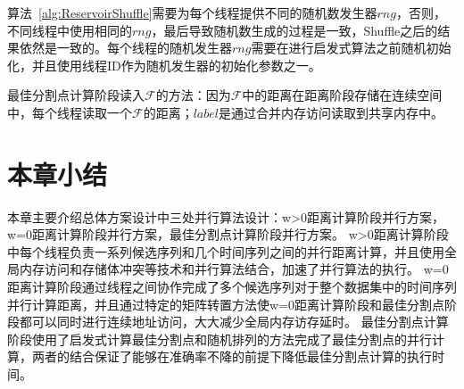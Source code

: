算法~\ref{alg:ReservoirShuffle}需要为每个线程提供不同的随机数发生器$rng$，否则，不同线程中使用相同的$rng$，最后导致随机数生成的过程是一致，Shuffle之后的结果依然是一致的。每个线程的随机发生器$rng$需要在进行启发式算法之前随机初始化，并且使用线程ID作为随机发生器的初始化参数之一。

最佳分割点计算阶段读入$\mathcal{F}$的方法：因为$\mathcal{F}$中的距离在距离阶段存储在连续空间中，每个线程读取一个$\mathcal{F}$的距离；$label$是通过合并内存访问读取到共享内存中。



\section{本章小结}

本章主要介绍总体方案设计中三处并行算法设计：w>0距离计算阶段并行方案，w=0距离计算阶段并行方案，最佳分割点计算阶段并行方案。
w>0距离计算阶段中每个线程负责一系列候选序列和几个时间序列之间的并行距离计算，并且使用全局内存访问和存储体冲突等技术和并行算法结合，加速了并行算法的执行。
w=0距离计算阶段通过线程之间协作完成了多个候选序列对于整个数据集中的时间序列并行计算距离，并且通过特定的矩阵转置方法使w=0距离计算阶段和最佳分割点阶段都可以同时进行连续地址访问，大大减少全局内存访存延时。
最佳分割点计算阶段使用了启发式计算最佳分割点和随机排列的方法完成了最佳分割点的并行计算，两者的结合保证了能够在准确率不降的前提下降低最佳分割点计算的执行时间。



